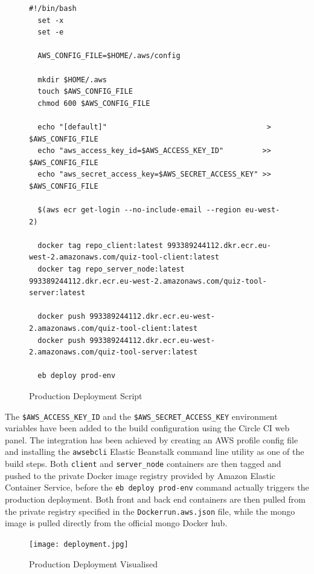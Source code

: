 \begin{figure}[h!]
  \begin{lstlisting}[basicstyle=\tiny, breaklines=true]
  #!/bin/bash
  set -x
  set -e

  AWS_CONFIG_FILE=$HOME/.aws/config

  mkdir $HOME/.aws
  touch $AWS_CONFIG_FILE
  chmod 600 $AWS_CONFIG_FILE

  echo "[default]"                                     > $AWS_CONFIG_FILE
  echo "aws_access_key_id=$AWS_ACCESS_KEY_ID"         >> $AWS_CONFIG_FILE
  echo "aws_secret_access_key=$AWS_SECRET_ACCESS_KEY" >> $AWS_CONFIG_FILE

  $(aws ecr get-login --no-include-email --region eu-west-2)

  docker tag repo_client:latest 993389244112.dkr.ecr.eu-west-2.amazonaws.com/quiz-tool-client:latest
  docker tag repo_server_node:latest 993389244112.dkr.ecr.eu-west-2.amazonaws.com/quiz-tool-server:latest

  docker push 993389244112.dkr.ecr.eu-west-2.amazonaws.com/quiz-tool-client:latest
  docker push 993389244112.dkr.ecr.eu-west-2.amazonaws.com/quiz-tool-server:latest

  eb deploy prod-env
  \end{lstlisting}
  \caption{Production Deployment Script}
\end{figure}

\newpage
The \texttt{\$AWS\_ACCESS\_KEY\_ID} and the \texttt{\$AWS\_SECRET\_ACCESS\_KEY} environment
variables have been added to the build configuration using the Circle CI web panel.
The integration has been achieved by creating an AWS profile config file and installing
the \texttt{awsebcli} Elastic Beanstalk command line utility as one of the build steps.
Both \texttt{client} and \texttt{server\_node} containers are then tagged and pushed
to the private Docker image registry provided by Amazon Elastic Container Service, before
the \texttt{eb deploy prod-env} command actually triggers the production deployment.
Both front and back end containers are then pulled from the private registry specified
in the \texttt{Dockerrun.aws.json} file, while the mongo image is pulled directly from
the official mongo Docker hub.

\begin{figure}[h!]
    \centering
    \texttt{[image: deployment.jpg]}
    \caption{Production Deployment Visualised}
    \label{fig:deploymentprocess}
\end{figure}

